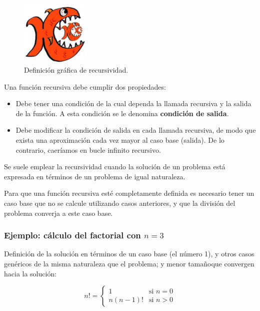 \documentclass[a4paper, 11pt, titlepage]{article}
\begin{document}
        \begin{figure}[htp]
            \centering
            \includegraphics[width=0.3\textwidth]{resources/recursividad.jpg}
            \caption{Definición gráfica de recursividad.}
            \label{recursividad01}
        \end{figure}

        Una función recursiva debe cumplir dos propiedades:

        \begin{itemize}
            \item Debe tener una condición de la cual dependa la llamada recursiva y la salida de la 
            función. A esta condición se le denomina \textbf{condición de salida}.
            \item Debe modificar la condición de salida en cada llamada recursiva, de modo que exista 
            una aproximación cada vez mayor al caso base (salida). De lo contrario, caeríamos en 
            bucle infinito recursivo.
        \end{itemize}

        Se suele emplear la recursividad cuando la solución de un problema está expresada en términos 
        de un problema de igual naturaleza.

        Para que una función recursiva esté completamente definida es necesario tener un caso base 
        que no se calcule utilizando casos anteriores, y que la división del problema converja a este 
        caso base.

        \subsubsection{Ejemplo: cálculo del factorial con $n=3$}\label{factorial}

            Definición de la solución en términos de un caso base (el número 1), y otros casos 
            genéricos de la misma naturaleza que el problema; y menor tamañoque convergen hacia la 
            solución:

            \[
            n! = \begin{cases} 
            1 & \mbox{si } n = 0 \\ 
            n (n-1)! & \mbox{si }  n > 0 \end{cases}    
            \]
    
\end{document}

